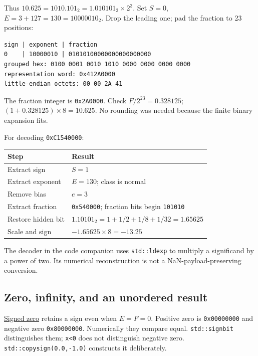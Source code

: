 Thus \(10.625=1010.101_2=1.010101_2\times2^3\). Set \(S=0\), \(E=3+127=130=10000010_2\). Drop the leading one; pad the fraction to 23 positions:

\begin{verbatim}
sign | exponent | fraction
0    | 10000010 | 01010100000000000000000
grouped hex: 0100 0001 0010 1010 0000 0000 0000 0000
representation word: 0x412A0000
little-endian octets: 00 00 2A 41
\end{verbatim}

The fraction integer is \texttt{0x2A0000}. Check \(F/2^{23}=0.328125\); \((1+0.328125)\times8=10.625\). No rounding was needed because the finite binary expansion fits.

For decoding \texttt{0xC1540000}:

{\def\LTcaptype{none} %
\begin{longtable}[]{@{}ll@{}}
\toprule\noalign{}
Step & Result \\
\midrule\noalign{}
\endhead
\bottomrule\noalign{}
\endlastfoot
Extract sign & \(S=1\) \\
Extract exponent & \(E=130\); class is normal \\
Remove bias & \(e=3\) \\
Extract fraction & \texttt{0x540000}; fraction bits begin \texttt{101010} \\
Restore hidden bit & \(1.10101_2=1+1/2+1/8+1/32=1.65625\) \\
Scale and sign & \(-1.65625\times8=-13.25\) \\
\end{longtable}
}

The decoder in the code companion uses \texttt{std::ldexp} to multiply a significand by a power of two. Its numerical reconstruction is not a NaN-payload-preserving conversion.

\subsection{Zero, infinity, and an unordered result}\label{01-foundations-i-ch001-zero-infinity-and-an-unordered-result}

\hyperref[appendix-3a048f032c1f]{Signed zero} retains a sign even when \(E=F=0\). Positive zero is \texttt{0x00000000} and negative zero \texttt{0x80000000}. Numerically they compare equal. \texttt{std::signbit} distinguishes them; \texttt{x\textless{}0} does not distinguish negative zero. \texttt{std::copysign(0.0,-1.0)} constructs it deliberately.

